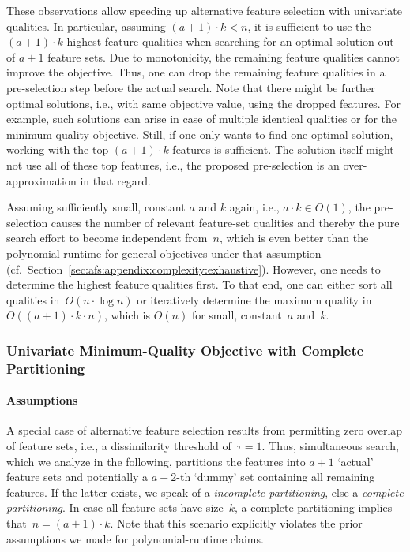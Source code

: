 \documentclass{article}
\theoremstyle{definition}
\begin{document}
These observations allow speeding up alternative feature selection with univariate qualities.
In particular, assuming $(a + 1) \cdot k < n$, it is sufficient to use the $(a + 1) \cdot k$ highest feature qualities when searching for an optimal solution out of $a + 1$ feature sets.
Due to monotonicity, the remaining feature qualities cannot improve the objective.
Thus, one can drop the remaining feature qualities in a pre-selection step before the actual search.
Note that there might be further optimal solutions, i.e., with same objective value, using the dropped features.
For example, such solutions can arise in case of multiple identical qualities or for the minimum-quality objective.
Still, if one only wants to find one optimal solution, working with the top $(a + 1) \cdot k$ features is sufficient.
The solution itself might not use all of these top features, i.e., the proposed pre-selection is an over-approximation in that regard.

Assuming sufficiently small, constant $a$ and $k$ again, i.e., $a \cdot k \in O(1)$, the pre-selection causes the number of relevant feature-set qualities and thereby the pure search effort to become independent from~$n$, which is even better than the polynomial runtime for general objectives under that assumption (cf.~Section~\ref{sec:afs:appendix:complexity:exhaustive}).
However, one needs to determine the highest feature qualities first.
To that end, one can either sort all qualities in~$O(n \cdot \log n)$ or iteratively determine the maximum quality in~$O((a+1) \cdot k \cdot n)$, which is $O(n)$ for small, constant~$a$ and~$k$.

\subsubsection{Univariate Minimum-Quality Objective with Complete Partitioning}
\label{sec:afs:appendix:complexity:uni-min-partitioning}

\paragraph{Assumptions}

A special case of alternative feature selection results from permitting zero overlap of feature sets, i.e., a dissimilarity threshold of~$\tau = 1$.
Thus, simultaneous search, which we analyze in the following, partitions the features into $a+1$ `actual' feature sets and potentially a $a+2$-th `dummy' set containing all remaining features.
If the latter exists, we speak of a \emph{incomplete partitioning}, else a \emph{complete partitioning}.
In case all feature sets have size~$k$, a complete partitioning implies that~$n = (a+1) \cdot k$.
Note that this scenario explicitly violates the prior assumptions we made for polynomial-runtime claims.
\end{document}
